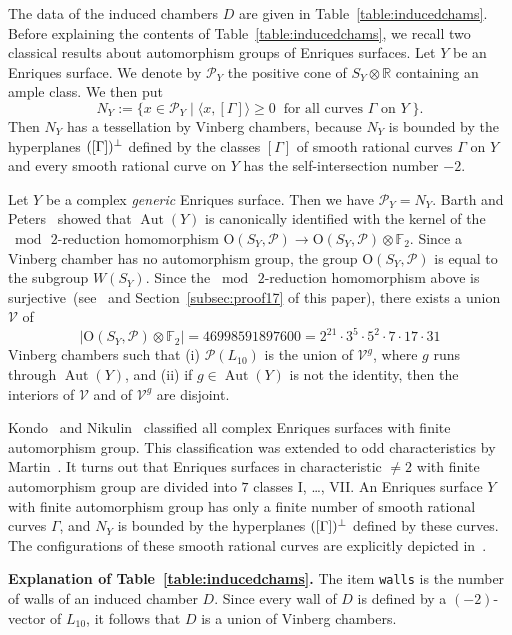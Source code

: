 \documentclass{amsart}
\numberwithin{equation}{section}
\numberwithin{table}{section}
\numberwithin{figure}{section}
\newcommand{\F}{\mathord{\mathbb F}}
\newcommand{\R}{\mathord{\mathbb R}}
\newcommand{\PPP}{\mathord{\mathcal P}}
\newcommand{\VVV}{\mathord{\mathcal V}}
\newcommand{\set}[2]{\{ {#1}\mid {#2}  \}}
\newcommand{\tensor}{\otimes}
\newcommand{\sperp}{\sp{\perp}}
\newcommand{\OG}{\mathord{\mathrm{O}}}
\newcommand{\Aut}{\operatorname{\mathrm{Aut}}\nolimits}
\newcommand{\intf}[1]{\langle #1 \rangle}
\newcommand{\OGP}[1]{\OG(#1, \PPP)}
\newcommand{\oLtenFtwo}{{2}^{21} \cdot {3}^{5} \cdot {5}^{2} \cdot {7} \cdot {17} \cdot {31} }
\begin{document}
%
\par
The data of the induced chambers $D$ are given in Table~\ref{table:inducedchams}.
Before explaining the contents of Table~\ref{table:inducedchams},
we recall two classical results about automorphism groups of  Enriques surfaces.
Let $Y$ be an Enriques surface.
We denote by  $\PPP_Y$  the positive cone of $S_Y\tensor \R$
containing an ample class.
We then put
\[
N_{Y}:=\set{x\in \PPP_Y}{\intf{x, [\Gamma]}\ge 0\;\;\textrm{for all curves $\Gamma$ on $Y$}\;}.
\]
Then $N_{Y}$ has a tessellation by Vinberg chambers,
because $N_{Y}$ is bounded by the hyperplanes $([\Gamma])\sperp$
defined by the classes $[\Gamma]$ of smooth rational curves $\Gamma$ on $Y$
and every smooth rational curve on $Y$ has the self-intersection number $-2$.
\par
Let $Y$ be a complex \emph{generic} Enriques surface.
Then we have $\PPP_Y=N_Y$.
Barth and Peters~\cite{BP1983} showed that
$\Aut(Y)$ is canonically identified with the kernel of
the $\bmod\, 2$-reduction homomorphism
$\OGP{S_Y}\to \OGP{S_Y}\tensor \F_2$.
Since a Vinberg chamber has no automorphism group,
the group  $\OGP{S_Y}$ is equal to the subgroup
$W(S_Y)$.
Since the $\bmod\, 2$-reduction homomorphism above is
surjective~(see~\cite{BP1983} and Section~\ref{subsec:proof17} of this paper),
there exists a union $\VVV$ of
\[
| \OGP{S_Y}\tensor \F_2|=46998591897600=\oLtenFtwo
\]
Vinberg chambers such that (i) $\PPP(L_{10})$ is the union of $\VVV^g$,
where $g$ runs through $\Aut(Y)$,
and (ii) if $g\in \Aut(Y)$ is not the identity,
then the interiors of $\VVV$ and of $\VVV^g$ are disjoint.
\par
Kondo~\cite{Kondo1986} and Nikulin~\cite{Nikulin1984}
classified all complex Enriques surfaces with finite automorphism group.
This classification was extended to odd characteristics by Martin~\cite{Martin2019}.
It turns out that Enriques surfaces in characteristic $\ne 2$
with finite automorphism group are divided into $7$ classes
\textrm{I}, \dots, \textrm{VII}.
An Enriques surface $Y$ with finite automorphism group
has only a finite number of smooth rational curves $\Gamma$,
and $N_{Y}$ is bounded by the hyperplanes
$([\Gamma])\sperp$ defined by these  curves.
The configurations of these smooth rational curves
are explicitly depicted in~\cite{Kondo1986}.
\par
\medskip
{\bf Explanation of  Table~\ref{table:inducedchams}.}
The item \texttt{walls} is the number of walls of an induced chamber $D$.
Since every wall of $D$ is defined by a $(-2)$-vector of $L_{10}$,
it follows that $D$ is a union of Vinberg chambers.
\end{document}
